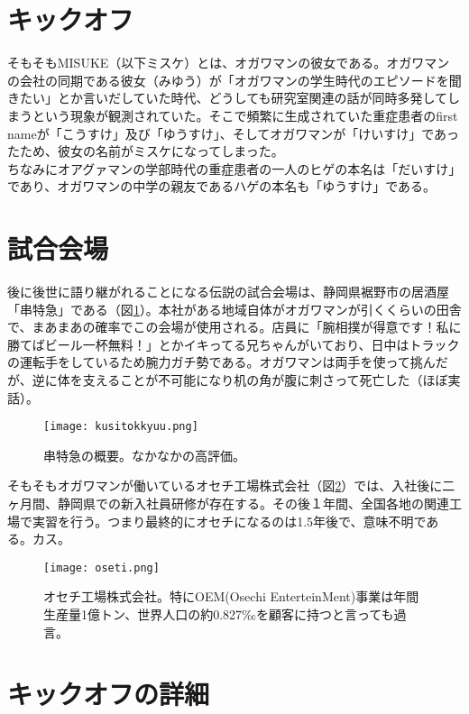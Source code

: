 \section{キックオフ}
\label{hagehage}
そもそもMISUKE（以下ミスケ）とは、オガワマンの彼女である。オガワマンの会社の同期である彼女（みゆう）が「オガワマンの学生時代のエピソードを聞きたい」とか言いだしていた時代、どうしても研究室関連の話が同時多発してしまうという現象が観測されていた。そこで頻繁に生成されていた重症患者のfirst nameが「こうすけ」及び「ゆうすけ」、そしてオガワマンが「けいすけ」であったため、彼女の名前がミスケになってしまった。\\
ちなみにオアグァマンの学部時代の重症患者の一人のヒゲの本名は「だいすけ」であり、オガワマンの中学の親友であるハゲの本名も「ゆうすけ」である。\\

\section{試合会場}
後に後世に語り継がれることになる伝説の試合会場は、静岡県裾野市の居酒屋「串特急」である（図\ref{kusitokkyuu}）。本社がある地域自体がオガワマンが引くくらいの田舎で、まあまあの確率でこの会場が使用される。店員に「腕相撲が得意です！私に勝てばビール一杯無料！」とかイキってる兄ちゃんがいており、日中はトラックの運転手をしているため腕力ガチ勢である。オガワマンは両手を使って挑んだが、逆に体を支えることが不可能になり机の角が腹に刺さって死亡した（ほぼ実話）。\\


\begin{figure}[H]
\centering
\texttt{[image: kusitokkyuu.png]}
\caption{串特急の概要。なかなかの高評価。}
\label{kusitokkyuu}
\end{figure}

そもそもオガワマンが働いているオセチ工場株式会社（図\ref{oseti}）では、入社後に二ヶ月間、静岡県での新入社員研修が存在する。その後１年間、全国各地の関連工場で実習を行う。つまり最終的にオセチになるのは1.5年後で、意味不明である。カス。

\begin{figure}[H]
\centering
\texttt{[image: oseti.png]}
\caption{オセチ工場株式会社。特にOEM(Osechi EnterteinMent)事業は年間生産量1億トン、世界人口の約0.827‰を顧客に持つと言っても過言。}
\label{oseti}
\end{figure}

\section{キックオフの詳細}



